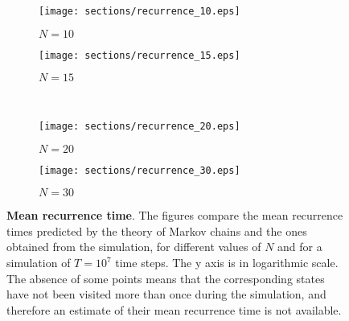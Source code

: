 \begin{figure}
  \begin{subfigure}{.5\textwidth}
      \centering
      \texttt{[image: sections/recurrence\_10.eps]}
      \caption{$N = 10$}
    \end{subfigure}
    \begin{subfigure}{.5\textwidth}
      \centering
      \texttt{[image: sections/recurrence\_15.eps]}
      \caption{$N = 15$}
    \end{subfigure}\\
    \begin{subfigure}{0.5\textwidth}
      \centering
      \texttt{[image: sections/recurrence\_20.eps]}
      \caption{$N = 20$}
    \end{subfigure}%
    \begin{subfigure}{0.5\textwidth}
      \centering
      \texttt{[image: sections/recurrence\_30.eps]}
      \caption{$N = 30$}
    \end{subfigure}%

  \captionsetup{width=.9\linewidth}
  \caption{\textbf{Mean recurrence time}. The figures  compare the mean recurrence times predicted by the theory of Markov chains and the ones obtained from the simulation, for different values of $N$ and for a simulation of $T= 10^7$ time steps. The y axis is in logarithmic scale. The absence of some points means that the corresponding states have not been visited more than once during the simulation, and therefore an estimate of their mean recurrence time is not available.}
  \label{fig:recurrence}
\end{figure}



